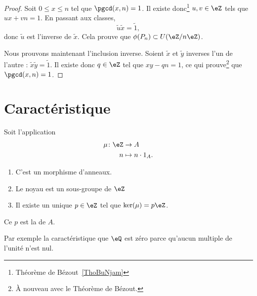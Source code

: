 \begin{proof}
    Soit \( 0\leq x\leq n\) tel que \( \pgcd(x,n)=1\). Il existe donc\footnote{Théorème de Bézout~\ref{ThoBuNjam}} \( u,v\in\eZ\) tels que \( ux+vn=1\). En passant aux classes,
    \begin{equation}
        \tilde u\tilde x=\tilde 1,
    \end{equation}
    donc \( \tilde u\) est l'inverse de \( \tilde x\). Cela prouve que \( \phi(P_n)\subset U(\eZ/n\eZ)\).

    Nous prouvons maintenant l'inclusion inverse. Soient \( \tilde x\) et \( \tilde y\) inverses l'un de l'autre : $\tilde x\tilde y=\tilde 1$. Il existe donc \( q\in\eZ\) tel que \( xy-qn=1\), ce qui prouve\footnote{À nouveau avec le Théorème de Bézout.} que \( \pgcd(x,n)=1\).
\end{proof}

\section{Caractéristique}

\begin{lemmaDef}        \label{LEMDEFooVEWZooUrPaDw}
    Soit l'application
    \begin{equation}
        \begin{aligned}
            \mu\colon \eZ&\to A \\
            n&\mapsto n\cdot 1_A .
        \end{aligned}
    \end{equation}
    \begin{enumerate}
        \item
            C'est un morphisme d'anneaux.
        \item
            Le noyau est un sous-groupe de \( \eZ\)
        \item
            Il existe un unique \( p\in \eZ\) tel que \( \ker(\mu)=p\eZ\).
    \end{enumerate}
    Ce \( p\) est la  de \( A\).
\end{lemmaDef}

Par exemple la caractéristique que \( \eQ\) est zéro parce qu'aucun multiple de l'unité n'est nul.

